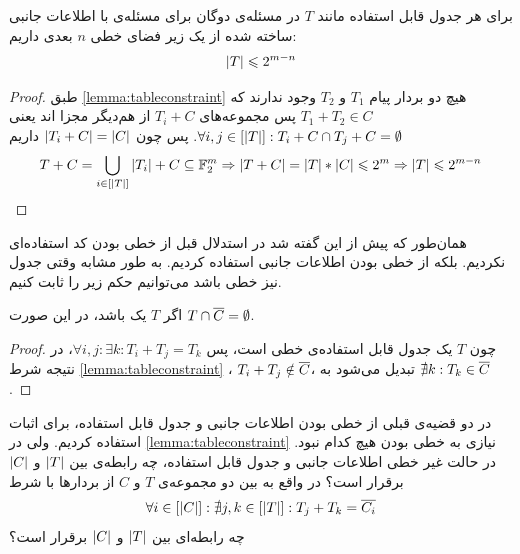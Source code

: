 \begin{theorem}
	\label{thm:our:hardexample}
	برای هر  جدول قابل استفاده
	مانند
	$T$
	 در مسئله‌ی دوگان برای مسئله‌ی
	\picod
	با اطلاعات جانبی ساخته شده از یک زیر فضای خطی
	$n$
	بعدی داریم:
	\begin{align*}
		\left|{T}\right| \leqslant 2^{m - n}
	\end{align*}
\end{theorem}
\begin{proof}
	طبق
	\autoref{lemma:tableconstraint}
	هیچ دو بردار پیام
	$T_1$
	و
	$T_2$
	وجود ندارند که
	$T_1 + T_2 \in C$
	پس مجموعه‌های
	$T_i + C$
	از هم‌دیگر مجزا اند یعنی
	$\forall i, j \in [\left|{T}\right|]: T_i + C \cap T_j + C = \emptyset$.
 پس چون
	$\left|{T_i + C}\right| = \left|{C}\right|$
	داریم
	\begin{align}
	T + C =  \bigcup_{i \in [\left|{T}\right|]} \left|{T_i}\right| + C \subseteq \mathbb{F}_2^m \Rightarrow \left|{T + C}\right| = \left|{T }\right| * \left|{C}\right| \leqslant 2^m \Rightarrow \left|{T}\right| \leqslant 2^{m - n}
		\end{align}
\end{proof}

همان‌طور که پیش از این گفته شد در استدلال قبل از خطی بودن کد استفاده‌ای نکردیم. بلکه از خطی بودن اطلاعات جانبی استفاده کردیم. به طور مشابه وقتی جدول نیز خطی باشد می‌توانیم حکم زیر را ثابت کنیم.
\begin{theorem}
	اگر 
	$T$
	یک 
	باشد، در این صورت
	$T \cap \overline{C} = \emptyset$.
\end{theorem}
\begin{proof}
	چون
	$T$
	یک جدول قابل استفاده‌ی خطی است، پس
	$\forall i, j: \exists k: T_i + T_j = T_k$،
	در نتیجه شرط
	\autoref{lemma:tableconstraint}
	،
	$T_i + T_j \notin \overline{C}$،
	تبدیل می‌شود به
	$\nexists k: T_k \in \overline{C}$.
\end{proof}

\begin{openproblem}
	در دو قضیه‌ی قبلی از خطی بودن اطلاعات جانبی و جدول قابل استفاده، برای اثبات استفاده کردیم. ولی در
	\autoref{lemma:tableconstraint}
	نیازی به خطی بودن هیچ کدام نبود. در حالت غیر خطی اطلاعات جانبی و جدول قابل استفاده، چه رابطه‌ی بین
	$\left|{T}\right|$
	و
	$\left|{C}\right|$
	برقرار است؟ در واقع به بین دو مجموعه‌ی
	$T$
	و
	$C$
	 از بردارها با شرط
 	\begin{align}
	 	\forall i \in [\left|{C}\right|]: \nexists j, k \in [\left|{T}\right|]: T_j + T_k = \overline{C_i}
	 \end{align}
	 چه رابطه‌ای بین
	 	$\left|{T}\right|$
	 و
	 $\left|{C}\right|$
	 برقرار است؟
\end{openproblem}

